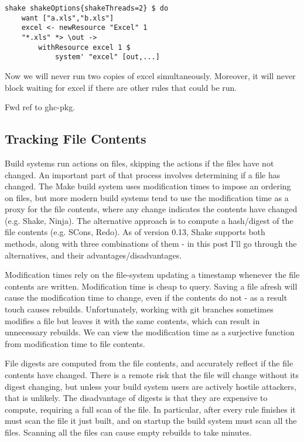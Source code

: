 \begin{lstlisting}
shake shakeOptions{shakeThreads=2} $ do
    want ["a.xls","b.xls"]
    excel <- newResource "Excel" 1
    "*.xls" *> \out ->
        withResource excel 1 $
            system' "excel" [out,...]
\end{lstlisting}

Now we will never run two copies of excel simultaneously. Moreover, it will never block waiting for excel if there are other rules that could be run.

Fwd ref to ghc-pkg.

\subsection{Tracking File Contents\label{sec:file-contents}}

Build systems run actions on files, skipping the actions if the files have not changed. An important part of that process involves determining if a file has changed. The Make build system uses modification times to impose an ordering on files, but more modern build systems tend to use the modification time as a proxy for the file contents, where any change indicates the contents have changed (e.g. Shake, Ninja). The alternative approach is to compute a hash/digest of the file contents (e.g. SCons, Redo). As of version 0.13, Shake supports both methods, along with three combinations of them - in this post I'll go through the alternatives, and their advantages/disadvantages.

Modification times rely on the file-system updating a timestamp whenever the file contents are written. Modification time is cheap to query. Saving a file afresh will cause the modification time to change, even if the contents do not - as a result touch causes rebuilds. Unfortunately, working with git branches sometimes modifies a file but leaves it with the same contents, which can result in unnecessary rebuilds. We can view the modification time as a surjective function from modification time to file contents.

File digests are computed from the file contents, and accurately reflect if the file contents have changed. There is a remote risk that the file will change without its digest changing, but unless your build system users are actively hostile attackers, that is unlikely. The disadvantage of digests is that they are expensive to compute, requiring a full scan of the file. In particular, after every rule finishes it must scan the file it just built, and on startup the build system must scan all the files. Scanning all the files can cause empty rebuilds to take minutes.

